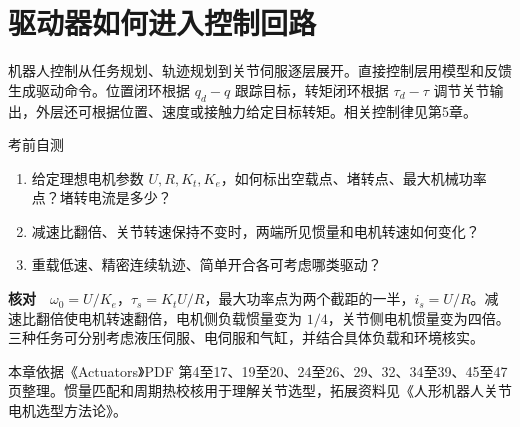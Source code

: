 \section{驱动器如何进入控制回路}

机器人控制从任务规划、轨迹规划到关节伺服逐层展开。直接控制层用模型和反馈生成驱动命令。位置闭环根据 $q_d-q$ 跟踪目标，转矩闭环根据 $\tau_d-\tau$ 调节关节输出，外层还可根据位置、速度或接触力给定目标转矩。相关控制律见第5章。

\begin{focusbox}{考前自测}
\begin{enumerate}[nosep]
\item 给定理想电机参数 $U,R,K_t,K_e$，如何标出空载点、堵转点、最大机械功率点？堵转电流是多少？
\item 减速比翻倍、关节转速保持不变时，两端所见惯量和电机转速如何变化？
\item 重载低速、精密连续轨迹、简单开合各可考虑哪类驱动？
\end{enumerate}
\textbf{核对}　$\omega_0=U/K_e$，$\tau_s=K_tU/R$，最大功率点为两个截距的一半，$i_s=U/R$。减速比翻倍使电机转速翻倍，电机侧负载惯量变为 $1/4$，关节侧电机惯量变为四倍。三种任务可分别考虑液压伺服、电伺服和气缸，并结合具体负载和环境核实。
\end{focusbox}

{\small 本章依据《Actuators》PDF 第4至17、19至20、24至26、29、32、34至39、45至47页整理。惯量匹配和周期热校核用于理解关节选型，拓展资料见《人形机器人关节电机选型方法论》。}
